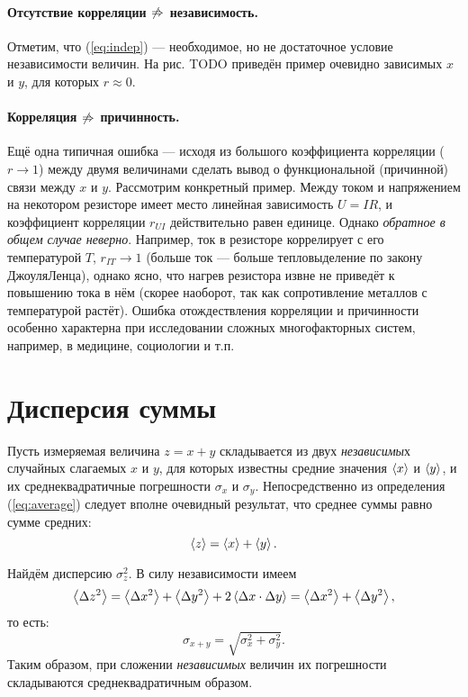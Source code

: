 \paragraph{Отсутствие корреляции $\protect\not\Rightarrow$ независимость.}

Отметим, что (\ref{eq:indep}) --- необходимое,
но не достаточное условие независимости величин. На рис. TODO приведён
пример очевидно зависимых $x$ и $y$, для которых $r\approx0$.

\paragraph{Корреляция $\protect\not\Rightarrow$ причинность.}

Ещё одна типичная ошибка --- исходя из большого
коэффициента корреляции ($r\to1$) между двумя величинами сделать
вывод о функциональной (причинной) связи между $x$ и $y$. Рассмотрим
конкретный пример. Между током и напряжением на некотором резисторе
имеет место линейная зависимость $U=IR$, и коэффициент корреляции
$r_{UI}$ действительно равен единице. Однако \emph{обратное
в общем случае неверно}. Например, ток в резисторе коррелирует
с его температурой $T$, $r_{IT}\to1$ (больше ток --- больше
тепловыделение по закону Джоуля\textendash Ленца), однако ясно, что
нагрев резистора извне не приведёт к повышению тока в нём (скорее
наоборот, так как сопротивление металлов с температурой растёт). Ошибка
отождествления корреляции и причинности особенно характерна при исследовании
сложных многофакторных систем, например, в медицине, социологии и
т.п.

\section{Дисперсия суммы}\label{sec:sum2}

Пусть измеряемая величина $z=x+y$ складывается из двух \emph{независимы}х
случайных слагаемых $x$ и $y$, для которых известны средние значения
$\left<x\right>$ и $\left<y\right>$, и их среднеквадратичные погрешности
$\sigma_{x}$ и $\sigma_{y}$. Непосредственно из определения (\ref{eq:average})
следует вполне очевидный результат, что среднее суммы равно сумме
средних:
\[
\left<z\right>=\left<x\right>+\left<y\right>.
\]

Найдём дисперсию $\sigma_{z}^{2}$. В силу независимости имеем
\[
\left<\Delta z^{2}\right>=\left<\Delta x^{2}\right>+\left<\Delta
y^{2}\right>+2\left<\Delta x\cdot\Delta y\right>=\left<\Delta x^{2}\right>+\left<\Delta
y^{2}\right>,
\]
то есть:
\begin{equation}
    \label{eq:sigma_sum}
    \boxed{{\sigma_{x+y}=\sqrt{\sigma_{x}^{2}+\sigma_{y}^{2}}}}.
\end{equation}
Таким образом, при сложении \emph{независимых }величин их погрешности
складываются среднеквадратичным образом.

